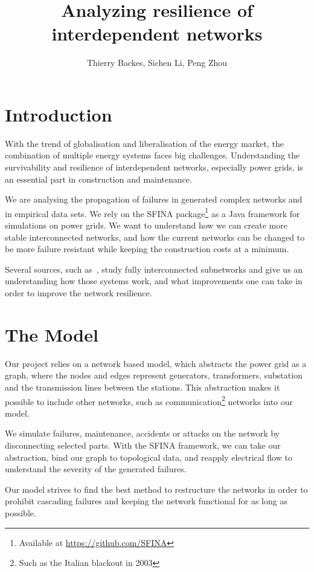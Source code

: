 \documentclass[11pt, a4paper]{article}
\begin{document}
\title{Analyzing resilience of interdependent networks}
\author{Thierry Backes, Sichen Li, Peng Zhou}
\date{}
\maketitle

\section{Introduction}
With the trend of globalisation and liberalisation of the energy market, the combination of multiple energy systems faces big challenges. Understanding the survivability and resilience of interdependent networks, especially power grids, is an essential part in construction and maintenance.

We are analysing the propagation of failures in generated complex networks and in empirical data sets. We rely on the  SFINA package\footnote{Available at \url{https://github.com/SFINA}} as a Java framework for simulations on power grids. We want to understand how we can create more stable interconnected networks, and how the current networks can be changed to be more failure resistant while keeping the construction costs at a minimum. 

Several sources, such as~\cite{schneider2013towards}, study fully interconnected subnetworks and give us an understanding how those systems work, and what improvements one can take in order to improve the network resilience.

\section{The Model}

Our project relies on a network based model, which abstracts the power grid as a graph, where the nodes and edges represent generators, transformers, substation and the transmission lines between the stations. This abstraction makes it possible to include other networks, such as communication\footnote{ Such as the Italian blackout in 2003}  networks into our model.

We simulate failures, maintenance, accidents or attacks on the network by disconnecting selected parts. With the SFINA framework, we can take our abstraction, bind our graph to topological data, and reapply electrical flow to understand the severity of the generated failures. 

Our model strives to find the best method to restructure the networks in order to prohibit cascading failures and keeping the network functional for as long as possible. 
\end{document}

